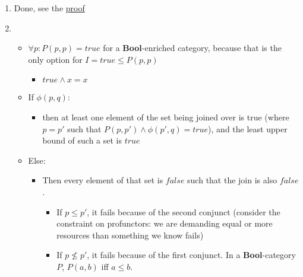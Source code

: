 \begin{enumerate}
    \item Done, see the \href{doc/1 math/Seven Sketches in Compositionality/Chapter 4: Co-design/3 Categories of profunctors/2 The categories V-Prof and Feas/4 Unitality of unit profunctor}{proof}
    \item
          \begin{itemize}
            \item $\forall p: P(p,p)=true$ for a \textbf{Bool}-enriched category, because that is the only option for $I=true\leq P(p,p)$
                  \begin{itemize}
                    \item $true \land x = x$
                  \end{itemize}
            \item If $\phi(p,q)$:
                  \begin{itemize}
                    \item then at least one element of the set being joined over is true (where $p=p'$ such that $P(p,p')\land \phi(p',q) = true$), and the least upper bound of such a set is $true$
                  \end{itemize}
            \item Else:
                  \begin{itemize}
                    \item Then every element of that set is $false$ such that the join is also $false$.
                          \begin{itemize}
                            \item If $p\leq p'$, it fails because of the second conjunct (consider the constraint on profunctors: we are demanding equal or more resources than something we know fails)
                            \item If $p \not \leq p'$, it fails because of the first conjunct. In a \textbf{Bool}-category $P$, $P(a,b)$ iff $a \leq b$.
                          \end{itemize}
                  \end{itemize}
          \end{itemize}

  \end{enumerate}
